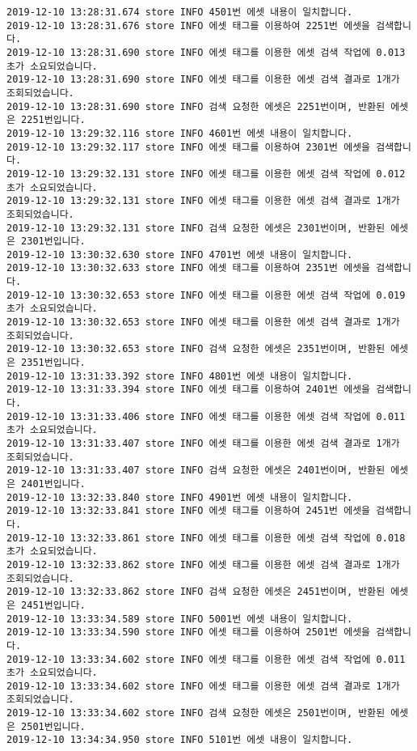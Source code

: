 \begin{Verbatim}[fontsize=\tiny, breaklines=true, breakanywhere=true]
2019-12-10 13:28:31.674 store INFO 4501번 에셋 내용이 일치합니다.
2019-12-10 13:28:31.676 store INFO 에셋 태그를 이용하여 2251번 에셋을 검색합니다.
2019-12-10 13:28:31.690 store INFO 에셋 태그를 이용한 에셋 검색 작업에 0.013초가 소요되었습니다.
2019-12-10 13:28:31.690 store INFO 에셋 태그를 이용한 에셋 검색 결과로 1개가 조회되었습니다.
2019-12-10 13:28:31.690 store INFO 검색 요청한 에셋은 2251번이며, 반환된 에셋은 2251번입니다.
2019-12-10 13:29:32.116 store INFO 4601번 에셋 내용이 일치합니다.
2019-12-10 13:29:32.117 store INFO 에셋 태그를 이용하여 2301번 에셋을 검색합니다.
2019-12-10 13:29:32.131 store INFO 에셋 태그를 이용한 에셋 검색 작업에 0.012초가 소요되었습니다.
2019-12-10 13:29:32.131 store INFO 에셋 태그를 이용한 에셋 검색 결과로 1개가 조회되었습니다.
2019-12-10 13:29:32.131 store INFO 검색 요청한 에셋은 2301번이며, 반환된 에셋은 2301번입니다.
2019-12-10 13:30:32.630 store INFO 4701번 에셋 내용이 일치합니다.
2019-12-10 13:30:32.633 store INFO 에셋 태그를 이용하여 2351번 에셋을 검색합니다.
2019-12-10 13:30:32.653 store INFO 에셋 태그를 이용한 에셋 검색 작업에 0.019초가 소요되었습니다.
2019-12-10 13:30:32.653 store INFO 에셋 태그를 이용한 에셋 검색 결과로 1개가 조회되었습니다.
2019-12-10 13:30:32.653 store INFO 검색 요청한 에셋은 2351번이며, 반환된 에셋은 2351번입니다.
2019-12-10 13:31:33.392 store INFO 4801번 에셋 내용이 일치합니다.
2019-12-10 13:31:33.394 store INFO 에셋 태그를 이용하여 2401번 에셋을 검색합니다.
2019-12-10 13:31:33.406 store INFO 에셋 태그를 이용한 에셋 검색 작업에 0.011초가 소요되었습니다.
2019-12-10 13:31:33.407 store INFO 에셋 태그를 이용한 에셋 검색 결과로 1개가 조회되었습니다.
2019-12-10 13:31:33.407 store INFO 검색 요청한 에셋은 2401번이며, 반환된 에셋은 2401번입니다.
2019-12-10 13:32:33.840 store INFO 4901번 에셋 내용이 일치합니다.
2019-12-10 13:32:33.841 store INFO 에셋 태그를 이용하여 2451번 에셋을 검색합니다.
2019-12-10 13:32:33.861 store INFO 에셋 태그를 이용한 에셋 검색 작업에 0.018초가 소요되었습니다.
2019-12-10 13:32:33.862 store INFO 에셋 태그를 이용한 에셋 검색 결과로 1개가 조회되었습니다.
2019-12-10 13:32:33.862 store INFO 검색 요청한 에셋은 2451번이며, 반환된 에셋은 2451번입니다.
2019-12-10 13:33:34.589 store INFO 5001번 에셋 내용이 일치합니다.
2019-12-10 13:33:34.590 store INFO 에셋 태그를 이용하여 2501번 에셋을 검색합니다.
2019-12-10 13:33:34.602 store INFO 에셋 태그를 이용한 에셋 검색 작업에 0.011초가 소요되었습니다.
2019-12-10 13:33:34.602 store INFO 에셋 태그를 이용한 에셋 검색 결과로 1개가 조회되었습니다.
2019-12-10 13:33:34.602 store INFO 검색 요청한 에셋은 2501번이며, 반환된 에셋은 2501번입니다.
2019-12-10 13:34:34.950 store INFO 5101번 에셋 내용이 일치합니다.

\end{Verbatim}
